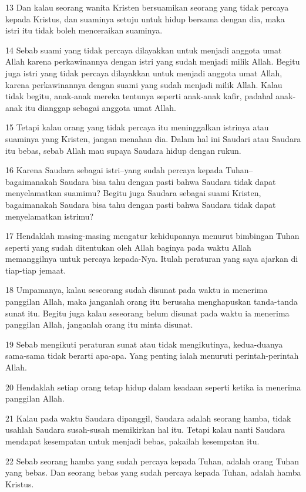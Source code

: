 \par 13 Dan kalau seorang wanita Kristen bersuamikan seorang yang tidak percaya kepada Kristus, dan suaminya setuju untuk hidup bersama dengan dia, maka istri itu tidak boleh menceraikan suaminya.
\par 14 Sebab suami yang tidak percaya dilayakkan untuk menjadi anggota umat Allah karena perkawinannya dengan istri yang sudah menjadi milik Allah. Begitu juga istri yang tidak percaya dilayakkan untuk menjadi anggota umat Allah, karena perkawinannya dengan suami yang sudah menjadi milik Allah. Kalau tidak begitu, anak-anak mereka tentunya seperti anak-anak kafir, padahal anak-anak itu dianggap sebagai anggota umat Allah.
\par 15 Tetapi kalau orang yang tidak percaya itu meninggalkan istrinya atau suaminya yang Kristen, jangan menahan dia. Dalam hal ini Saudari atau Saudara itu bebas, sebab Allah mau supaya Saudara hidup dengan rukun.
\par 16 Karena Saudara sebagai istri--yang sudah percaya kepada Tuhan--bagaimanakah Saudara bisa tahu dengan pasti bahwa Saudara tidak dapat menyelamatkan suamimu? Begitu juga Saudara sebagai suami Kristen, bagaimanakah Saudara bisa tahu dengan pasti bahwa Saudara tidak dapat menyelamatkan istrimu?
\par 17 Hendaklah masing-masing mengatur kehidupannya menurut bimbingan Tuhan seperti yang sudah ditentukan oleh Allah baginya pada waktu Allah memanggilnya untuk percaya kepada-Nya. Itulah peraturan yang saya ajarkan di tiap-tiap jemaat.
\par 18 Umpamanya, kalau seseorang sudah disunat pada waktu ia menerima panggilan Allah, maka janganlah orang itu berusaha menghapuskan tanda-tanda sunat itu. Begitu juga kalau seseorang belum disunat pada waktu ia menerima panggilan Allah, janganlah orang itu minta disunat.
\par 19 Sebab mengikuti peraturan sunat atau tidak mengikutinya, kedua-duanya sama-sama tidak berarti apa-apa. Yang penting ialah menuruti perintah-perintah Allah.
\par 20 Hendaklah setiap orang tetap hidup dalam keadaan seperti ketika ia menerima panggilan Allah.
\par 21 Kalau pada waktu Saudara dipanggil, Saudara adalah seorang hamba, tidak usahlah Saudara susah-susah memikirkan hal itu. Tetapi kalau nanti Saudara mendapat kesempatan untuk menjadi bebas, pakailah kesempatan itu.
\par 22 Sebab seorang hamba yang sudah percaya kepada Tuhan, adalah orang Tuhan yang bebas. Dan seorang bebas yang sudah percaya kepada Tuhan, adalah hamba Kristus.
